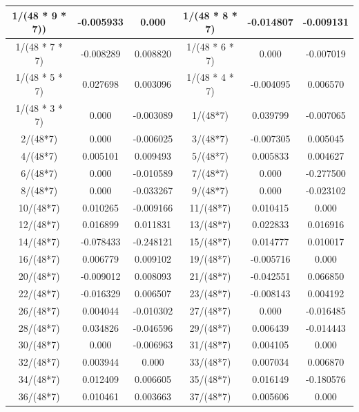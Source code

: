 \documentclass[12pt,msc]{uom_eee_dissertation_casson}
\begin{document}
\begin{table}
\begin{tabular}{| c | c | c | c | c | c |}
1/(48 * 9 * 7))  & -0.005933 &  0.000    & 1/(48 * 8 * 7)     & -0.014807 & -0.009131 \\ \hline
1/(48 * 7 * 7)   & -0.008289 &  0.008820 & 1/(48 * 6 * 7)     &  0.000    & -0.007019 \\ \hline
1/(48 * 5 * 7)   &  0.027698 &  0.003096 & 1/(48 * 4 * 7)     & -0.004095 &  0.006570 \\ \hline
1/(48 * 3 * 7)   &  0.000    & -0.003089 & 1/(48*7)           &  0.039799 & -0.007065 \\ \hline
2/(48*7)         &  0.000    & -0.006025 & 3/(48*7)           & -0.007305 &  0.005045  \\ \hline
4/(48*7)         &  0.005101 &  0.009493 & 5/(48*7)           &  0.005833 &  0.004627  \\ \hline
6/(48*7)         &  0.000    & -0.010589 & 7/(48*7)           &  0.000    & -0.277500 \\ \hline
8/(48*7)         &  0.000    & -0.033267 & 9/(48*7)           &  0.000    & -0.023102 \\ \hline
10/(48*7)        &  0.010265 & -0.009166 & 11/(48*7)          &  0.010415 &  0.000\\ \hline
12/(48*7)        &  0.016899 &  0.011831 & 13/(48*7)          &  0.022833 &  0.016916 \\ \hline
14/(48*7)        & -0.078433 & -0.248121 & 15/(48*7)          &  0.014777 &  0.010017 \\ \hline
16/(48*7)        &  0.006779 &  0.009102 & 19/(48*7)          & -0.005716 &  0.000 \\ \hline
20/(48*7)        & -0.009012 &  0.008093 & 21/(48*7)          & -0.042551 &  0.066850 \\ \hline
22/(48*7)        & -0.016329 &  0.006507 & 23/(48*7)          & -0.008143 &  0.004192 \\ \hline
26/(48*7)        &  0.004044 & -0.010302 & 27/(48*7)          &  0.000    & -0.016485 \\ \hline
28/(48*7)        &  0.034826 & -0.046596 & 29/(48*7)          &  0.006439 & -0.014443 \\ \hline
30/(48*7)        &  0.000    & -0.006963 & 31/(48*7)          &  0.004105 &  0.000\\ \hline
32/(48*7)        &  0.003944 &  0.000    & 33/(48*7)          &  0.007034 &  0.006870 \\ \hline
34/(48*7)        &  0.012409 &  0.006605 & 35/(48*7)          &  0.016149 & -0.180576  \\ \hline
36/(48*7)        &  0.010461 &  0.003663 & 37/(48*7)          &  0.005606 &  0.000\\ \hline

\end{tabular}
\end{table}
\end{document}
